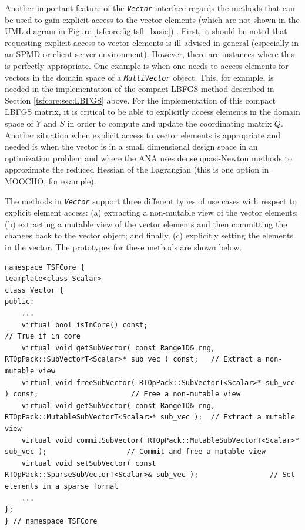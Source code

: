 Another important feature of the \texttt{\textit{Vector}} interface
regards the methods that can be used to gain explicit access to the
vector elements (which are not shown in the UML diagram in Figure
\ref{tsfcore:fig:tsfl_basic}) .  First, it should be noted that requesting
explicit access to vector elements is ill advised in general
(especially in an SPMD or client-server environment).  However, there
are instances where this is perfectly appropriate.  One example is
when one needs to access elements for vectors in the domain space of a
\texttt{\textit{Multi\-Vector}} object.  This, for example, is needed in the
implementation of the compact LBFGS method described in Section
\ref{tsfcore:sec:LBFGS} above.  For the implementation of this compact
LBFGS matrix, it is critical to be able to explicitly access elements
in the domain space of $Y$ and $S$ in order to compute and update the
coordinating matrix $Q$.  Another situation when explicit access to
vector elements is appropriate and needed is when the vector is in a
small dimensional design space in an optimization problem and where
the ANA uses dense quasi-Newton methods to approximate the reduced
Hessian of the Lagrangian (this is one option in MOOCHO, for example).

The methods in \texttt{\textit{Vector}} support three different types
of use cases with respect to explicit element access: (a) extracting a
non-mutable view of the vector elements; (b) extracting a mutable view
of the vector elements and then committing the changes back to the
vector object; and finally, (c) explicitly setting the elements in the
vector.  The prototypes for these methods are shown below.

{\tiny\begin{verbatim}
namespace TSFCore {
teamplate<class Scalar>
class Vector {
public:
    ...
    virtual bool isInCore() const;                                                                  // True if in core
    virtual void getSubVector( const Range1D& rng, RTOpPack::SubVectorT<Scalar>* sub_vec ) const;   // Extract a non-mutable view
    virtual void freeSubVector( RTOpPack::SubVectorT<Scalar>* sub_vec ) const;                      // Free a non-mutable view
    virtual void getSubVector( const Range1D& rng, RTOpPack::MutableSubVectorT<Scalar>* sub_vec );  // Extract a mutable view
    virtual void commitSubVector( RTOpPack::MutableSubVectorT<Scalar>* sub_vec );                   // Commit and free a mutable view
    virtual void setSubVector( const RTOpPack::SparseSubVectorT<Scalar>& sub_vec );                 // Set elements in a sparse format
    ...
};
} // namespace TSFCore
\end{verbatim}}

